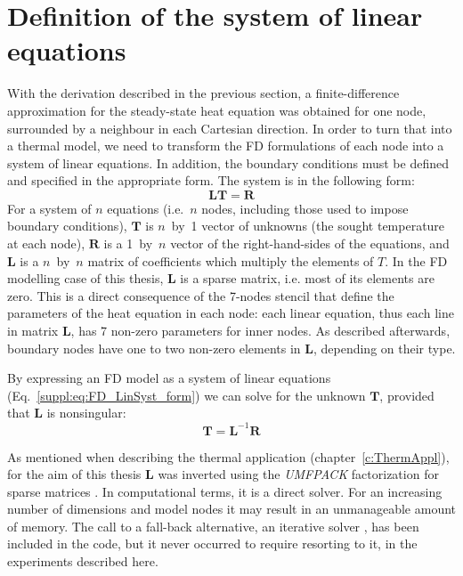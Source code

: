 \section{Definition of the system of linear equations}
\label{s:ThermModel:FD_LinSyst}
With the derivation described in the previous section, a finite-difference approximation for the steady-state heat equation was obtained for one node, surrounded by a neighbour in each Cartesian direction.
In order to turn that into a thermal model, we need to transform the FD formulations of each node into a system of linear equations.
In addition, the boundary conditions must be defined and specified in the appropriate form.
The system is in the following form:
\begin{equation}
    \label{suppl:eq:FD_LinSyst_form}
    \bm{L} \bm{T} = \bm{R}
\end{equation}
For a system of $n$ equations (i.e.~$n$ nodes, including those used to impose boundary conditions), $\bm{T}$ is $n$~by~\num{1} vector of unknowns (the sought temperature at each node), $\bm{R}$ is a \num{1}~by~$n$ vector of the right-hand-sides of the equations, and $\bm{L}$ is a $n$~by~$n$ matrix of coefficients which multiply the elements of $T$.
In the FD modelling case of this thesis, $\bm{L}$ is a sparse matrix, i.e. most of its elements are zero.
This is a direct consequence of the 7-nodes stencil that define the parameters of the heat equation in each node: each linear equation, thus each line in matrix $\bm{L}$, has 7 non-zero parameters for inner nodes.
As described afterwards, boundary nodes have one to two non-zero elements in $\bm{L}$, depending on their type.

By expressing an FD model as a system of linear equations (Eq.~\ref{suppl:eq:FD_LinSyst_form}) we can solve for the unknown $\bm{T}$, provided that $\bm{L}$ is nonsingular:
\begin{equation}
    \label{suppl:eq:FD_LinSyst_inversion}
    \bm{T} = \bm{L}^{-1} \bm{R}
\end{equation}

As mentioned when describing the thermal application (chapter~\ref{c:ThermAppl}), for the aim of this thesis $\bm{L}$ was inverted using the \textit{UMFPACK} factorization for sparse matrices \parencite{Davis2006}.
In computational terms, it is a direct solver.
For an increasing number of dimensions and model nodes it may result in an unmanageable amount of memory.
The call to a fall-back alternative, an iterative solver \parencite[the generalized minimal residual method, \textit{gmres}, see][]{Saad1986gmres}, has been included in the code, but it never occurred to require resorting to it, in the experiments described here.

